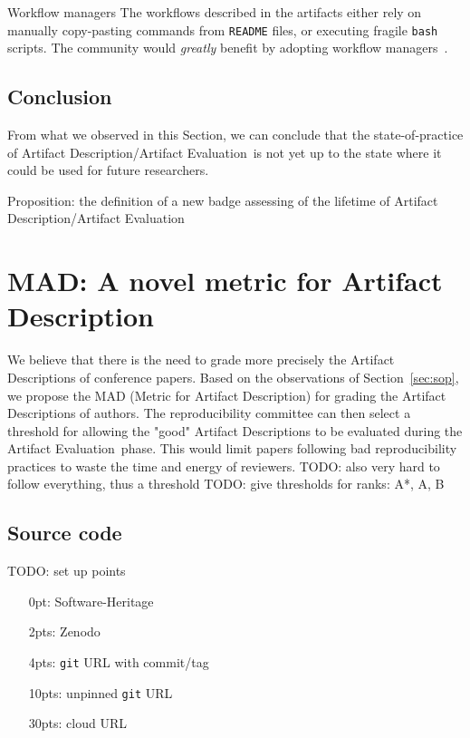 \documentclass[sigconf,natbib=false]{acmart}
\newcommand{\ad}{Artifact Description}
\newcommand{\aeval}{Artifact Evaluation}
\newcommand{\adae}{\ad/\aeval}
\newcommand{\todo}[1]{{\color{red}TODO: #1}}
\begin{document}
\begin{lesson}{Workflow managers}{}
  The workflows described in the artifacts either rely on manually copy-pasting commands from \texttt{README} files, or executing fragile \texttt{bash} scripts.
  The community would \emph{greatly} benefit by adopting workflow managers\ \cite{wratten2021reproducible}.
\end{lesson}

\subsection{Conclusion}\label{sec:sop:conclu}

From what we observed in this Section, we can conclude that the state-of-practice of \adae\ is not yet up to the state where it could be used for future researchers.

Proposition: the definition of a new badge assessing of the lifetime of \adae


%
\section{MAD: A novel metric for \ad}

We believe that there is the need to grade more precisely the \ad s of conference papers.
Based on the observations of Section\ \ref{sec:sop}, we propose the MAD (Metric for \ad) for grading the \ad s of authors.
The reproducibility committee can then select a threshold for allowing the "good" \ad s to be evaluated during the \aeval\ phase.
This would limit papers following bad reproducibility practices to waste the time and energy of reviewers.
\todo{also very hard to follow everything, thus a threshold}
\todo{give thresholds for ranks: A*, A, B}


\subsection{Source code}

\todo{set up points}

\begin{itemize}
  \item[0pt:] Software-Heritage
  \item[2pts:] Zenodo
  \item[4pts:] \texttt{git} URL with commit/tag
  \item[10pts:] unpinned \texttt{git} URL
  \item[30pts:] cloud URL
\end{itemize}
\end{document}

